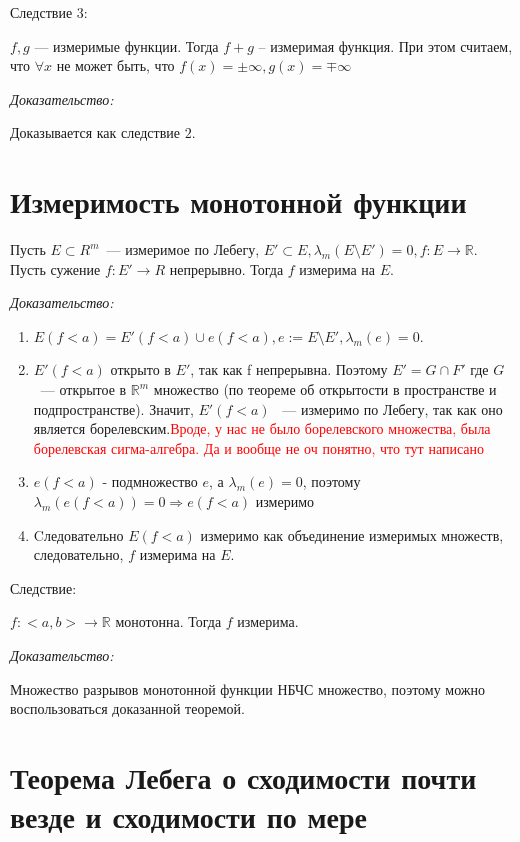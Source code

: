 \documentclass[paper=a4, fontsize=17pt]{article}
\begin{document}
Следствие $3$:

$f, g$ --- измеримые функции. Тогда $f + g$ -- измеримая функция. При этом считаем, что $\forall x$ не может быть, что $f(x) = \pm \infty, g(x) = \mp \infty$

\emph{Доказательство:}

Доказывается как следствие $2$.

\section{Измеримость монотонной функции}

Пусть $E \subset R^m$~--- измеримое по Лебегу, $E' \subset E, \lambda_m (E \setminus E') = 0, f: E \rightarrow \mathds{R}.$ Пусть сужение $f: E' \rightarrow R$ непрерывно. Тогда $f$ измерима на $E$.

\emph{Доказательство:}

\begin{enumerate}
	\item $E(f < a) = E'(f < a) \cup e(f < a), e:=E \setminus E', \lambda_m(e) = 0$.
	\item $ E'(f < a)$ открыто в $E'$, так как f непрерывна. Поэтому $E' = G \cap F'$ где $G$ ~--- открытое в $\mathds{R}^m$ множество (по теореме об открытости в пространстве и подпространстве).  Значит, $E'(f<a)$ ~--- измеримо по Лебегу, так как оно является борелевским.\textcolor{red}{Вроде, у нас не было борелевского множества, была борелевская сигма-алгебра. Да и вообще не оч понятно, что тут написано}
	\item $e(f < a)$ - подмножество $e$, а $\lambda_m(e) = 0$, поэтому $\lambda_m(e(f < a)) = 0 \Rightarrow e(f < a)$ измеримо
	\item Cледовательно $E(f < a)$ измеримо как объединение измеримых множеств, следовательно, $f$ измерима на $E$.
\end{enumerate}

Следствие:

$f: <a, b> \rightarrow \mathds{R}$ монотонна. Тогда $f$ измерима.

\emph{Доказательство:}

Множество разрывов монотонной функции НБЧС множество, поэтому можно воспользоваться доказанной теоремой.

\section{Теорема Лебега о сходимости почти везде и сходимости по мере}
\end{document}
